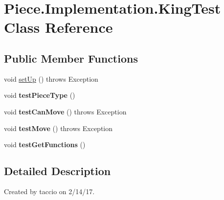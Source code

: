 \hypertarget{classPiece_1_1Implementation_1_1KingTest}{\section{Piece.\-Implementation.\-King\-Test Class Reference}
\label{classPiece_1_1Implementation_1_1KingTest}
}
\subsection*{Public Member Functions}
\begin{DoxyCompactItemize}
\item 
void \hyperlink{classPiece_1_1Implementation_1_1KingTest_a22f09584c054283dda9d38323edb8700}{set\-Up} ()  throws Exception 
\item 
\hypertarget{classPiece_1_1Implementation_1_1KingTest_a73c625357616ccb229967e8a02e6d7ce}{void {\bfseries test\-Piece\-Type} ()}\label{classPiece_1_1Implementation_1_1KingTest_a73c625357616ccb229967e8a02e6d7ce}

\item 
\hypertarget{classPiece_1_1Implementation_1_1KingTest_a9f8b42cc4c08d715cf92dd6494d16c37}{void {\bfseries test\-Can\-Move} ()  throws Exception}\label{classPiece_1_1Implementation_1_1KingTest_a9f8b42cc4c08d715cf92dd6494d16c37}

\item 
\hypertarget{classPiece_1_1Implementation_1_1KingTest_ae340bfe3b9bcba957edd108ecf519c9e}{void {\bfseries test\-Move} ()  throws Exception}\label{classPiece_1_1Implementation_1_1KingTest_ae340bfe3b9bcba957edd108ecf519c9e}

\item 
\hypertarget{classPiece_1_1Implementation_1_1KingTest_ab7c93313959595737056c7aef04c535e}{void {\bfseries test\-Get\-Functions} ()}\label{classPiece_1_1Implementation_1_1KingTest_ab7c93313959595737056c7aef04c535e}

\end{DoxyCompactItemize}


\subsection{Detailed Description}
Created by taccio on 2/14/17. 

